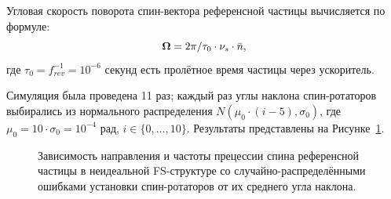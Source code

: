 Угловая скорость поворота спин-вектора референсной частицы вычисляется по формуле:~\cite[стр.~4]{COSY:SpinTuneMapping}
\[
\boldsymbol{\Omega} = 2\pi/\tau_0\cdot \nu_s \cdot \bar n,
\]
где $\tau_0 = f^{-1}_{rev} = 10^{-6}$ секунд есть пролётное время частицы через ускоритель.

Симуляция была проведена 11 раз; каждый раз углы наклона
спин-ротаторов выбирались из нормального распределения
$N(\mu_0\cdot(i-5), \sigma_0)$, где $\mu_0 = 10\cdot \sigma_0 =
10^{-4}$ рад, $i\in\lbrace0,\dots, 10\rbrace$. Результаты представлены
на Рисунке~\ref{fig:Linearity_test_shifting_gauss}.

\begin{figure}[!h]
	\centering
	\caption{Зависимость направления и частоты прецессии спина референсной частицы в неидеальной FS-структуре со случайно-распределёнными ошибками установки спин-ротаторов от их среднего угла наклона.\label{fig:Linearity_test_shifting_gauss}}
\end{figure}


